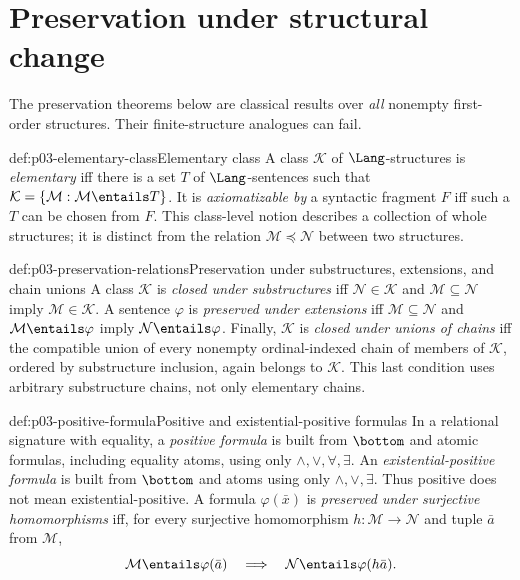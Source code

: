 \section{Preservation under structural change}
\label{sec:p03-preservation}

The preservation theorems below are classical results over \emph{all}
nonempty first-order structures.  Their finite-structure analogues can fail.

\begin{hbdefinition}{def:p03-elementary-class}{Elementary class}
A class \(\mathcal K\) of \(\Lang\)-structures is \emph{elementary} iff there
is a set \(T\) of \(\Lang\)-sentences such that
\(\mathcal K=\{\mathcal M:\mathcal M\entails T\}\).  It is
\emph{axiomatizable by} a syntactic fragment \(F\) iff such a \(T\) can be
chosen from \(F\).  This class-level notion describes a collection of whole
structures; it is distinct from the relation
\(\mathcal M\preccurlyeq\mathcal N\) between two structures.
\end{hbdefinition}

\begin{hbdefinition}{def:p03-preservation-relations}{Preservation under substructures, extensions, and chain unions}
A class \(\mathcal K\) is \emph{closed under substructures} iff
\(\mathcal N\in\mathcal K\) and \(\mathcal M\subseteq\mathcal N\) imply
\(\mathcal M\in\mathcal K\).  A sentence \(\varphi\) is
\emph{preserved under extensions} iff
\(\mathcal M\subseteq\mathcal N\) and
\(\mathcal M\entails\varphi\) imply
\(\mathcal N\entails\varphi\).  Finally, \(\mathcal K\) is
\emph{closed under unions of chains} iff the compatible union of every
nonempty ordinal-indexed chain of members of \(\mathcal K\), ordered by
substructure inclusion, again belongs to \(\mathcal K\).  This last condition
uses arbitrary substructure chains, not only elementary chains.
\end{hbdefinition}

\begin{hbdefinition}{def:p03-positive-formula}{Positive and existential-positive formulas}
In a relational signature with equality, a \emph{positive formula} is built
from \(\bottom\) and atomic formulas, including equality atoms, using only
\(\land,\lor,\forall,\exists\).  An \emph{existential-positive formula} is
built from \(\bottom\) and atoms using only \(\land,\lor,\exists\).  Thus
positive does not mean
existential-positive.  A formula \(\varphi(\bar x)\) is
\emph{preserved under surjective homomorphisms} iff, for every surjective
homomorphism \(h:\mathcal M\to\mathcal N\) and tuple \(\bar a\) from
\(\mathcal M\),
\[
 \mathcal M\entails\varphi(\bar a)
 \quad\Longrightarrow\quad
 \mathcal N\entails\varphi(h\bar a).
\]
\end{hbdefinition}

